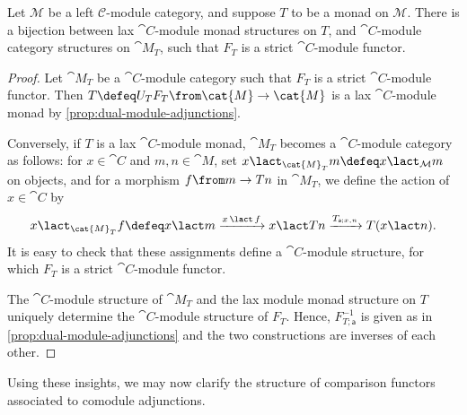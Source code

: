 \begin{corollary}\label{laxKlCorrespondence}
  Let \(\mathcal{M}\) be a left \(\mathcal{C}\)\hyp{}module category,
  and suppose \(T\) to be a monad on \(\mathcal{M}\).
  There is a bijection between
  lax \(\cat{C}\)\hyp{}module monad structures on \(T\),
  and
  \(\cat{C}\)\hyp{}module category structures on \(\cat{M}_T\),
  such that \(F_T\) is a strict \(\cat{C}\)\hyp{}module functor.
\end{corollary}
\begin{proof}
  Let \(\cat{M}_T\) be a \(\cat{C}\)\hyp{}module category
  such that \(F_T\) is a strict \(\cat{C}\)\hyp{}module functor.
  Then
  \(T \defeq U_T F_T \from \cat{M} \to \cat{M}\)
  is a lax \(\cat{C}\)\hyp{}module monad by \cref{prop:dual-module-adjunctions}.

  Conversely, if \(T\) is a lax \(\cat{C}\)\hyp{}module monad,
  \(\cat{M}_T\) becomes a \(\cat{C}\)\hyp{}module category as follows:
  for \(x \in \cat{C}\) and \(m,n \in \cat{M}\),
  set \(x \lact_{\cat{M}_T} m \defeq x \lact_{\mathcal{M}} m\) on objects,
  and for a morphism \(f \from m \to Tn\) in \(\cat{M}_T\),
  we define the action of \(x \in \cat{C}\) by
  \[
    x \lact_{\cat{M}_T} f \defeq x \lact m \xrightarrow{x \,\lact\, f} x \lact Tn \xrightarrow{T_{\mathsf{a};x,n}} T(x \lact n).
  \]
  It is easy to check that these assignments define a \(\cat{C}\)\hyp{}module structure,
  for which \(F_T\) is a strict \(\cat{C}\)\hyp{}module functor.

  The \(\cat{C}\)\hyp{}module structure of \(\cat{M}_T\)
  and the lax module monad structure on \(T\) uniquely determine the \(\cat{C}\)\hyp{}module structure of \(F_T\).
  Hence, \(F_{T;\mathsf{a}}^{-1}\) is given as in \cref{prop:dual-module-adjunctions}
  and the two constructions are inverses of each other.
\end{proof}

Using these insights, we may now clarify the structure of comparison functors associated to comodule adjunctions.

